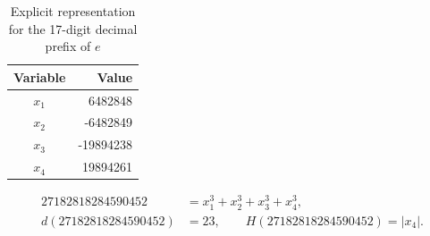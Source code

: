 \begin{table}[H]
\centering
\caption{Explicit representation for the 17-digit decimal prefix of \(e\)}
\label{tab:rep_e_prefix}
\begin{tabular}{c@{\qquad}r}
\toprule
Variable & Value \\
\midrule
$x_1$ & 6482848 \\
$x_2$ & -6482849 \\
$x_3$ & -19894238 \\
$x_4$ & 19894261 \\
\bottomrule
\end{tabular}
\[
\begin{aligned}
        27182818284590452 &= x_1^3+x_2^3+x_3^3+x_4^3,\\
        d(27182818284590452) &= 23,\qquad H(27182818284590452)=|x_4|.
\end{aligned}
\]
\end{table}
